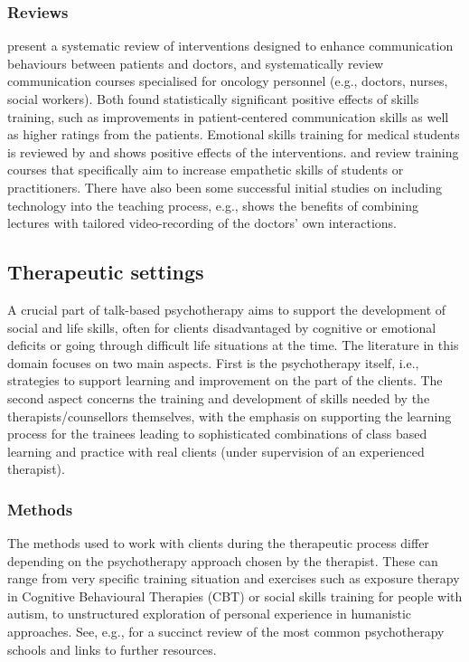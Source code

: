 \documentclass[prodmode,acmtochi]{acmsmall}
\begin{document}
\subsubsection*{Reviews}  present a systematic review of interventions designed to enhance communication behaviours between patients and doctors, and  systematically review communication courses specialised for oncology personnel (e.g., doctors, nurses, social workers). Both  found statistically significant positive effects of skills training, such as improvements in patient-centered communication skills as well as higher ratings from the patients. Emotional skills training for medical students is reviewed by \cite{Satterfield2007} and shows positive effects of the interventions.  and  review training courses that specifically aim to increase empathetic skills of students or practitioners. There have also been some successful initial studies
on including technology into the teaching process, e.g., 
shows the benefits of combining lectures with tailored video-recording of
the doctors' own interactions.



\subsection{Therapeutic settings}
A crucial part of talk-based psychotherapy aims to support the development of social and life skills, often for clients  disadvantaged by cognitive or emotional deficits or going through difficult life situations at the time. %
%
The literature in this domain focuses on two main aspects. First is the psychotherapy itself, i.e., strategies to support learning and improvement on the part of the clients. The second aspect concerns the training and development of skills needed by the therapists/counsellors themselves, with the emphasis on supporting the learning process for the trainees leading to sophisticated combinations of class based learning and practice with real clients (under supervision of an experienced therapist). 



\subsubsection*{Methods}  
The methods used to work with clients during the therapeutic process differ depending on the psychotherapy approach chosen by the therapist. These can range from very specific training situation and exercises such as exposure therapy in Cognitive Behavioural Therapies (CBT) or social skills training for people with autism, to unstructured exploration of personal experience in humanistic approaches.  See, e.g.,  for a succinct review of the most common psychotherapy schools and links to further resources. 
\end{document}
